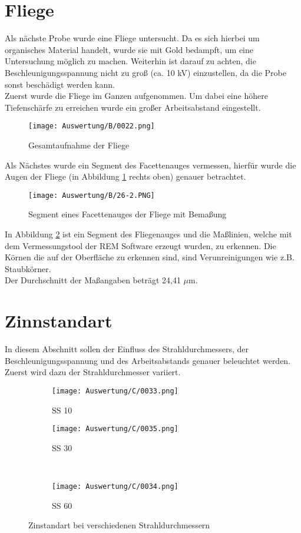 \newpage
\section{Fliege}

Als nächste Probe wurde eine Fliege untersucht. Da es sich hierbei um organisches Material handelt, wurde sie mit Gold bedampft, um eine Untersuchung möglich zu machen. Weiterhin ist darauf zu achten, die Beschleunigungsspannung nicht zu groß (ca. 10  kV) einzustellen, da die Probe sonst beschädigt werden kann. \\

Zuerst wurde die Fliege im Ganzen aufgenommen. Um dabei eine höhere Tiefenschärfe zu erreichen wurde ein großer Arbeitsabstand eingestellt.
\begin{figure}[h]
    \centering
    \texttt{[image: Auswertung/B/0022.png]}
    \caption{Gesamtaufnahme der Fliege}
    \label{fig:FGA}
\end{figure}

\newpage
Als Nächstes wurde ein Segment des Facettenauges vermessen, hierfür wurde die Augen der Fliege (in Abbildung \ref{fig:FGA} rechts oben) genauer betrachtet.
\begin{figure}[h]
    \centering
    \texttt{[image: Auswertung/B/26-2.PNG]}
    \caption{Segment eines Facettenauges der Fliege mit Bemaßung}
    \label{fig:FAF}
\end{figure}
In Abbildung \ref{fig:FAF} ist ein Segment des Fliegenauges und die Maßlinien, welche mit dem Vermessungstool der REM Software erzeugt wurden, zu erkennen. Die Körnen die auf der Oberfläche zu erkennen sind, sind Verunreinigungen wie z.B. Staubkörner.\\
Der Durchschnitt der Maßangaben beträgt 24,41 $\mu$m.

\newpage
\section{Zinnstandart}
In diesem Abschnitt sollen der Einfluss des Strahldurchmessers, der Beschleunigungsspannung und des Arbeitsabstands genauer beleuchtet werden. \\

Zuerst wird dazu der Strahldurchmesser variiert.
\begin{figure}[h]
    \centering
    \begin{subfigure}[b]{0.45\textwidth}
        \centering
        \texttt{[image: Auswertung/C/0033.png]}
        \caption{SS 10}
    \end{subfigure}
    \hfill
    \begin{subfigure}[b]{0.45\textwidth}
        \centering
        \texttt{[image: Auswertung/C/0035.png]}
        \caption{SS 30}
    \end{subfigure}
    \\
    \begin{subfigure}[b]{0.45\textwidth}
        \centering
        \texttt{[image: Auswertung/C/0034.png]}
        \caption{SS 60}
    \end{subfigure}
    \caption{Zinstandart bei verschiedenen Strahldurchmessern}
\end{figure}

